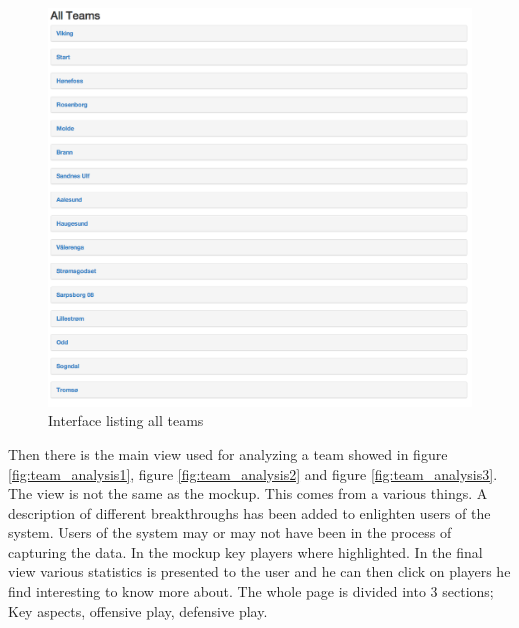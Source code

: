 \begin{figure}[ht!]
\centering
\includegraphics[width=1\textwidth]{images/general/all_teams.png}
\caption{Interface listing all teams}
\label{fig:all_teams}
\end{figure}

Then there is the main view used for analyzing a team showed in figure \ref{fig:team_analysis1}, figure \ref{fig:team_analysis2} and figure \ref{fig:team_analysis3}. The view is not the same as the mockup. This comes from a various things. A description of different breakthroughs has been added to enlighten users of the system. Users of the system may or may not have been in the process of capturing the data. In the mockup key players where highlighted. In the final view various statistics is presented to the user and he can then click on players he find interesting to know more about.  The whole page is divided into 3 sections; Key aspects, offensive play, defensive play.

